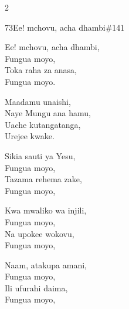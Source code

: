 \documentclass{article}
\begin{document}
\begin{multicols}{2}
\begin{hymn}{73}{Ee! mchovu, acha dhambi}{\#141}
\begin{stanza}
Ee! mchovu, acha dhambi,\\
Fungua moyo,\\
Toka raha za anasa,\\
Fungua moyo.
\end{stanza}
\begin{chorus}
Maadamu unaishi,\\
Naye Mungu ana hamu,\\
Uache kutangatanga,\\
Urejee kwake.
\end{chorus}
\begin{stanza}
Sikia sauti ya Yesu,\\
Fungua moyo,\\
Tazama rehema zake,\\
Fungua moyo,
\end{stanza}
\begin{stanza}
Kwa mwaliko wa injili,\\
Fungua moyo,\\
Na upokee wokovu,\\
Fungua moyo,
\end{stanza}
\begin{stanza}
Naam, atakupa amani,\\
Fungua moyo,\\
Ili ufurahi daima,\\
Fungua moyo,
\end{stanza}
\end{hymn}


\end{multicols}
\end{document}
